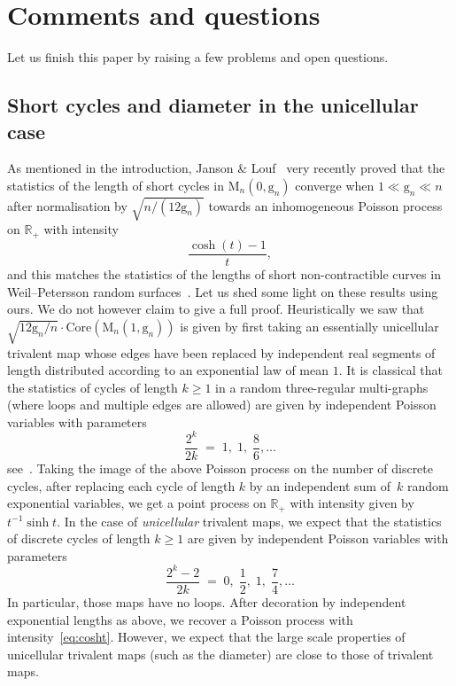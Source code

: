 \documentclass[11pt]{article}
\theoremstyle{plain}
\theoremstyle{definition}
\theoremstyle{remark}
\newcommand{\R}{\mathbb{R}}
\newcommand{\Map}{\mathrm{M}}
\newcommand{\gen}{\mathrm{g}}
\begin{document}
\section{Comments and questions}
\label{sec:comments}

Let us finish this paper by raising a few problems and open questions.

\subsection{Short cycles and diameter in the unicellular case}

As mentioned in the introduction, Janson \& Louf~\cite{JL21b} very recently proved that the statistics of the length of short cycles in $ \Map_{n}(0, \gen_{n})$ converge when $ 1 \ll \gen_n \ll n$ after normalisation by $ \sqrt{n/(12 \gen_{n})}$ towards an inhomogeneous Poisson process on $\R_{+}$ with intensity
\begin{equation}\label{eq:cosht}
\frac{\cosh (t)-1}{t},
\end{equation}
and this matches the statistics of the lengths of short non-contractible curves in Weil--Petersson random surfaces~\cite{MP19}. Let us shed some light on these results using ours. We do not however claim to give a full proof. Heuristically we saw that $ \sqrt{12 \gen_{n}/n} \cdot \mathrm{Core}(\Map_{n}(1, \gen_n))$ is given by first taking an essentially unicellular trivalent map whose edges have been replaced by independent real segments of length distributed according to an exponential law of mean $1$.
It is classical that the statistics of cycles of length $k\geq 1$ in a random three-regular multi-graphs (where loops and multiple edges are allowed) are given by independent Poisson variables with parameters
\[
\frac{2^k}{2k} \;=\; 1,\;1,\;\frac{8}{6}, \dots
\]
see~\cite[Th.\,2.5]{Wor99}. Taking the image of the above Poisson process on the number of discrete cycles, after replacing each cycle of length $k$ by an independent sum of~$k$ random exponential variables, we get a point process on $\R_{+}$ with intensity given by $t^{-1} \sinh t$. In the case of \emph{unicellular} trivalent maps, we expect that the statistics of discrete cycles of length $k\geq 1$ are given by independent Poisson variables with parameters
\[
\frac{2^{k}-2}{2k} \;=\; 0,\;\frac{1}{2},\;1,\;\frac{7}{4}, \dots
\]
In particular, those maps have no loops. After decoration by independent exponential lengths as above, we recover a Poisson process with intensity~\eqref{eq:cosht}. However, we expect that the large scale properties of unicellular trivalent maps (such as the diameter) are close to those of trivalent maps.
\end{document}
